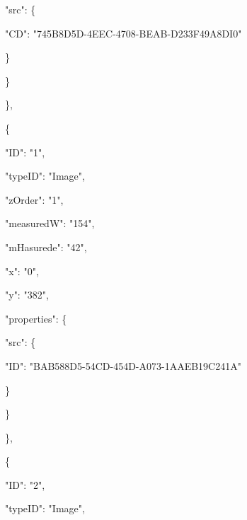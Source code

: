 \documentclass[13pt]{article}
\begin{document}
{\raggedright
{\footnotesize                                         "src": \{}
}

{\raggedright
{\footnotesize                                             "CD":
"745B8D5D-4EEC-4708-BEAB-D233F49A8DI0"}
}

{\raggedright
{\footnotesize                                         \}}
}

{\raggedright
{\footnotesize                                     \}}
}

{\raggedright
{\footnotesize                                 \},}
}

{\raggedright
{\footnotesize                                 \{}
}

{\raggedright
{\footnotesize                                     "ID": "1",}
}

{\raggedright
{\footnotesize                                     "typeID": "Image",}
}

{\raggedright
{\footnotesize                                     "zOrder": "1",}
}

{\raggedright
{\footnotesize                                     "measuredW": "154",}
}

{\raggedright
{\footnotesize                                     "mHasurede": "42",}
}

{\raggedright
{\footnotesize                                     "x": "0",}
}

{\raggedright
{\footnotesize                                     "y": "382",}
}

{\raggedright
{\footnotesize                                     "properties": \{}
}

{\raggedright
{\footnotesize                                         "src": \{}
}

{\raggedright
{\footnotesize                                             "ID":
"BAB588D5-54CD-454D-A073-1AAEB19C241A"}
}

{\raggedright
{\footnotesize                                         \}}
}

{\raggedright
{\footnotesize                                     \}}
}

{\raggedright
{\footnotesize                                 \},}
}

{\raggedright
{\footnotesize                                 \{}
}

{\raggedright
{\footnotesize                                     "ID": "2",}
}

{\raggedright
{\footnotesize                                     "typeID": "Image",}
}
\end{document}
